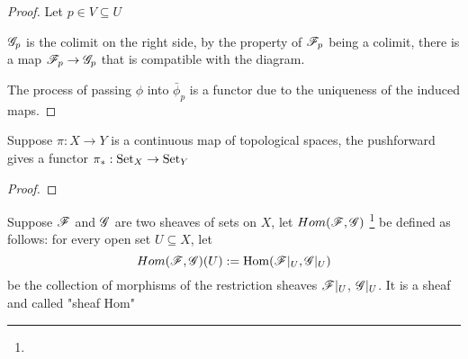 \begin{proof}
	Let $p \in V \subseteq U$
	\begin{center}
	\end{center}
	
	$\mathscr{G}_p$ is the colimit on the right side, by the property of $\mathscr{F}_p$ being a colimit, there is a map $\mathscr{F}_p \to \mathscr{G}_p$ that is compatible with the diagram.
	
	\begin{center}
	\end{center}
	
	The process of passing $\phi$ into $\bar{\phi}_p$ is a functor due to the uniqueness of the induced maps.
\end{proof}

\begin{proposition}
	Suppose $\pi: X \to Y$ is a continuous map of topological spaces, the pushforward gives a functor $\pi_*: \operatorname{Set}_X \to \operatorname{Set}_Y$
\end{proposition}

\begin{proof}
\end{proof}

\begin{definition}
	Suppose $\mathscr{F}$ and $\mathscr{G}$ are two sheaves of sets on $X$, let $Hom(\mathscr{F}, \mathscr{G})$ \footnote{} be defined as follows: for every open set $U \subseteq X$, let
	$$
		Hom(\mathscr{F}, \mathscr{G})(U) := \operatorname{Hom}(\mathscr{F}\vert_U, \mathscr{G}\vert_U)
	$$
	be the collection of morphisms of the restriction sheaves $\mathscr{F}\vert_U$, $\mathscr{G}\vert_U$. It is a sheaf and called "sheaf Hom"
\end{definition}

